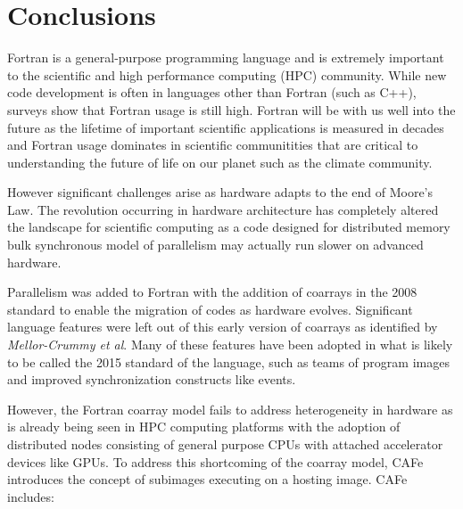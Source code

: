 \section{Conclusions}

Fortran is a general-purpose programming language and is extremely important to the
scientific and high performance computing (HPC) community.  While new code development is
often in languages other than Fortran (such as C++), surveys show that Fortran usage is
still high\cite{prabhu2011survey}.  Fortran will be with us well into the future as the
lifetime of important scientific applications is measured in decades and Fortran usage
dominates in scientific communitities that are critical to understanding the future of
life on our planet such as the climate community.

However significant challenges arise as hardware adapts to the end of Moore's
Law\cite{exascale:workshop:2011}.  The revolution occurring in hardware architecture
has completely altered the landscape for scientific computing as a code designed for
distributed memory bulk synchronous model of parallelism may actually run slower on
advanced hardware\cite{Dubey:2014:SSC:2686745.2686756}.

Parallelism was added to Fortran with the addition of coarrays in the 2008
standard\cite{fortran:2008} to enable the migration of codes as hardware evolves.
Significant language features were left out of this early version of coarrays as
identified by \emph{Mellor-Crummy et al}\cite{mellor-crummey:2009:caf2}.  Many of these features
have been adopted in what is likely to be called the 2015 standard of the language\cite{fortran:2015},
such as teams of program images and improved synchronization constructs like events.


However, the Fortran coarray model fails to address heterogeneity in hardware as is already
being seen in HPC computing platforms with the adoption of distributed nodes consisting of
general purpose CPUs with attached accelerator devices like GPUs.  To address this shortcoming
of the coarray model, CAFe introduces the concept of subimages executing on a hosting image.  
CAFe includes:

